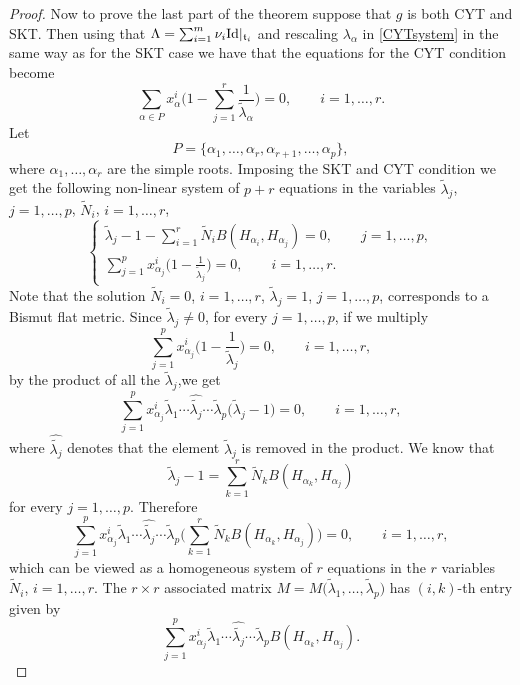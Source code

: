 \documentclass[pdftex]{sigma}
\numberwithin{equation}{section}
\begin{document}
\begin{proof}
Now to prove the last part of the theorem suppose that $g$ is both CYT and SKT. Then using that $\Lambda = \sum_{i =1}^m \nu_i {\rm Id} |_{\mathfrak t_i}$ and rescaling $\lambda_{\alpha}$ in \eqref{CYTsystem} in the same way as for the SKT case we have that the equations for the CYT condition become
\[
\sum_{\alpha \in P} x_\alpha^i\Bigg(1 - \sum_{j =1}^r \frac{1}{\tilde \lambda_{\alpha}} \Bigg) = 0, \qquad i = 1, \dots ,r.
\]
Let
\[
P = \{ \alpha_1, \dots, \alpha_r, \alpha_{r + 1}, \dots, \alpha_p \},
\]
where $\alpha_1, \dots, \alpha_r$ are the simple roots.
Imposing the SKT and CYT condition we get the following non-linear system of $p + r$ equations in the variables $\tilde \lambda_{j}$, $j =1, \dots, p$, $\tilde N_i$, $i = 1, \dots, r$,
\begin{equation}\label{newsystem}
 \begin{cases}
\displaystyle \tilde \lambda_{j}-1 - \sum_{i = 1}^r \tilde N_i B(H_{\alpha_i}, H_{\alpha_j})=0, \qquad j = 1, \dots, p,\\
\displaystyle \sum_{j=1}^p x_{\alpha_j}^i \bigg(1 - \frac{1}{\tilde \lambda_{j}} \bigg) =0, \qquad i = 1, \dots, r.
\end{cases}
\end{equation}
Note that the solution $\tilde N_i =0$, $i=1, \dots, r$, $\tilde \lambda_j = 1$, $j = 1, \dots, p$, corresponds to a Bismut flat metric.
Since $ \tilde \lambda_j \neq 0$, for every $j = 1, \dots, p$, if we multiply
\[
\sum_{j=1}^p x_{\alpha_j}^i \bigg(1 - \frac{1}{\tilde \lambda_{j}} \bigg) =0, \qquad i = 1, \dots, r,
\]
by the product of all the $\tilde \lambda_j$,we get
\[
\sum_{j=1}^p x_{\alpha_j}^i \tilde \lambda_1 \cdots \hat{\tilde {\lambda_j}} \cdots \tilde \lambda _p \big(\tilde \lambda_j - 1\big) =0, \qquad i = 1, \dots, r,
\]
where $\hat{ \tilde {\lambda_{j} }}$ denotes that the element $\tilde \lambda_{j}$ is removed in the product. We know that
\[
\tilde \lambda_{j}-1 = \sum_{k = 1}^r \tilde N_k B(H_{\alpha_k}, H_{\alpha_j})
\]
for every $j = 1, \dots, p$. Therefore
\[
\sum_{j=1}^p x_{\alpha_j}^i \tilde \lambda_1 \cdots \hat{\tilde {\lambda_j}} \cdots \tilde \lambda _p \Bigg (\sum_{k = 1}^r \tilde N_k B(H_{\alpha_k}, H_{\alpha_j})\Bigg)=0, \qquad i = 1, \dots, r,
\]
 which can be viewed as a homogeneous system of $r$ equations in the $r$ variables $\tilde N_i$, $i = 1, \dots, r$. The $r \times r$ associated matrix $M = M\big(\tilde \lambda_1, \dots, \tilde \lambda_p\big)$ has $(i,k)$-th entry given by
\[
\sum_{j=1}^p x_{\alpha_j}^i \tilde \lambda_1 \cdots \hat{\tilde {\lambda_j}} \cdots \tilde \lambda _p B(H_{\alpha_k}, H_{\alpha_j}).
\]
\end{proof}
\end{document}
